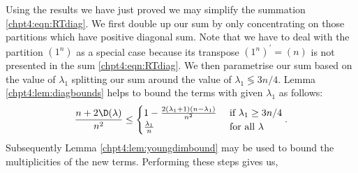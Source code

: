 \documentclass[11pt]{report}
\begin{document}
Using the results we have just proved we may simplify the summation 
\eqref{chpt4:eqn:RTdiag}. 
We first double up our sum by only concentrating on those partitions 
which have positive diagonal sum. Note that we have to deal with the 
partition $(1^{n})$ as a special case because its transpose $(1^{n})^{\prime} = (n)$ is not 
presented in the sum \eqref{chpt4:eqn:RTdiag}. We then parametrise our sum based on the value of $\lambda_{1}$ splitting our sum around the value of $\lambda_{1} \lessgtr 3n/4$. Lemma \ref{chpt4:lem:diagbounds} helps to bound the terms with given $\lambda_{1}$ as follows:
\begin{eqnarray}
\frac{n + 2\D(\lambda)}{n^{2}} \leq  \begin{cases} 1 - \frac{2(\lambda_{1}+1)(n-\lambda_{1})}{n^{2}} & \text{ if } \lambda_{1} \geq 3n/4 \\
\frac{\lambda_{1}}{n} & \text{ for all } \lambda
\end{cases} \label{chpt4:eqn:firstrowbound}.
\end{eqnarray}
Subsequently Lemma \ref{chpt4:lem:youngdimbound} may be used to bound the multiplicities of the new terms. Performing these steps gives us,
\end{document}
